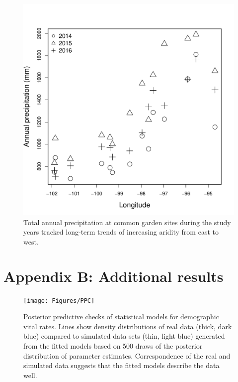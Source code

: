 \documentclass[11pt]{article}
\begin{document}
\newpage
\begin{figure}[h!]
	\begin{center}
		\includegraphics[width=0.75\linewidth]{Figures/site_precip}
		\caption{Total annual precipitation at common garden sites during the study years tracked long-term trends of increasing aridity from east to west.}
		\label{fig:site_precip}
	\end{center}
\end{figure}

\newpage
\section*{Appendix B: Additional results}
\renewcommand{\thefigure}{B\arabic{figure}}\setcounter{figure}{0}
\renewcommand{\thetable}{B\arabic{table}}\setcounter{table}{0}
\renewcommand{\theequation}{B\arabic{equation}}\setcounter{equation}{0}

\begin{figure}[H]
	\begin{center}
		\texttt{[image: Figures/PPC]}
		\caption{Posterior predictive checks of statistical models for demographic vital rates. 
			Lines show density distributions of real data (thick, dark blue) compared to simulated data sets (thin, light blue) generated from the fitted models based on 500 draws of the posterior distribution of parameter estimates. 
			Correspondence of the real and simulated data suggests that the fitted models describe the data well.}
		\label{fig:PPC}
	\end{center}
\end{figure}
\end{document}
